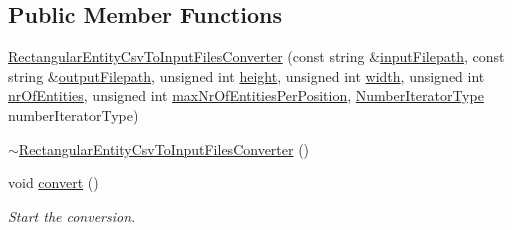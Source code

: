 \subsection*{\-Public \-Member \-Functions}
\begin{DoxyCompactItemize}
\item 
\hyperlink{classmultiscale_1_1video_1_1RectangularEntityCsvToInputFilesConverter_aad6061faff7cfbe5c005faf460d77951}{\-Rectangular\-Entity\-Csv\-To\-Input\-Files\-Converter} (const string \&\hyperlink{classmultiscale_1_1video_1_1RectangularEntityCsvToInputFilesConverter_adde5ccc0bde141f73917eba8029fe1f6}{input\-Filepath}, const string \&\hyperlink{classmultiscale_1_1video_1_1RectangularEntityCsvToInputFilesConverter_a84ea5fc8e195a17eb929812f962cb851}{output\-Filepath}, unsigned int \hyperlink{classmultiscale_1_1video_1_1RectangularEntityCsvToInputFilesConverter_a68cb5dba20157ea4977c1069626cb0ab}{height}, unsigned int \hyperlink{classmultiscale_1_1video_1_1RectangularEntityCsvToInputFilesConverter_ac4542ad4008e85ab4860146eed6e0200}{width}, unsigned int \hyperlink{classmultiscale_1_1video_1_1RectangularEntityCsvToInputFilesConverter_aebbddb80b0b0e44e4ea8e111994a2f5d}{nr\-Of\-Entities}, unsigned int \hyperlink{classmultiscale_1_1video_1_1RectangularEntityCsvToInputFilesConverter_adcea224ee3e6f8fbecca3754774afbac}{max\-Nr\-Of\-Entities\-Per\-Position}, \hyperlink{namespacemultiscale_a6ef911f4d48a4bf5e657c237ec169ff5}{\-Number\-Iterator\-Type} number\-Iterator\-Type)
\item 
\hyperlink{classmultiscale_1_1video_1_1RectangularEntityCsvToInputFilesConverter_af3085f7d4f6836c0d5edf19f4a59bac7}{$\sim$\-Rectangular\-Entity\-Csv\-To\-Input\-Files\-Converter} ()
\item 
void \hyperlink{classmultiscale_1_1video_1_1RectangularEntityCsvToInputFilesConverter_a7cf56e73e5b1c627bab05d4be3cdb405}{convert} ()
\begin{DoxyCompactList}\small\item\em \-Start the conversion. \end{DoxyCompactList}\end{DoxyCompactItemize}
